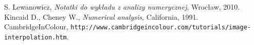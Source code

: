 \begin{thebibliography}{99}
   S. Lewanowicz, {\it Notatki do wykładu z analizy numerycznej}, Wrocław, 2010.
 Kincaid D., Cheney W., {\it Numerical analysis}, California, 1991.
 CambridgeInColour, \verb|http://www.cambridgeincolour.com/tutorials/image-interpolation.htm|.
\end{thebibliography}

